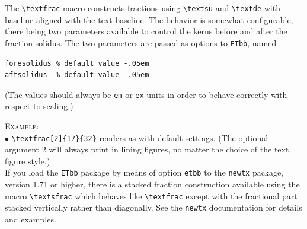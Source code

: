 \documentclass[11pt]{article}
\begin{document}
The \verb|\textfrac| macro constructs fractions using \verb|\textsu| and \verb|\textde| with baseline aligned with the text baseline. The behavior is somewhat configurable, there being two parameters available to control the kerns before and after the fraction solidus. The two parameters are passed as options to {\tt ETbb}, named
\begin{verbatim}
foresolidus % default value -.05em
aftsolidus  % default value -.05em
\end{verbatim}
(The values should always be {\tt em} or {\tt ex} units in order to behave correctly with respect to scaling.)

\textsc{Example:}\\
$\bullet$ \verb|\textfrac[2]{17}{32}| renders as  with default settings. (The optional argument 2 will always print in lining figures, no matter the choice of the text figure style.)\\

If you load the {\tt ETbb} package by means of option {\tt etbb} to the {\tt newtx} package, version 1.71 or higher, there is a stacked fraction construction available using the macro \verb|\textsfrac| which behaves like \verb|\textfrac| except with the fractional part stacked vertically rather than diagonally. See the {\tt newtx} documentation for details and examples.

\end{document}
